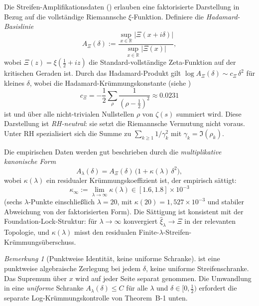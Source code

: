 \documentclass[12pt,a4paper]{article}
\theoremstyle{definition}
\theoremstyle{remark}
\newtheorem{remark}[theorem]{Bemerkung}
\begin{document}
Die Streifen-Amplifikationsdaten ()
erlauben eine faktorisierte Darstellung in Bezug auf die vollständige
Riemannsche $\xi$-Funktion. Definiere die \emph{Hadamard-Basislinie}
\begin{equation}\label{eq:A-Xi}
  A_\Xi(\delta) := \frac{\sup_{x\in\mathbb R}|\Xi(x+i\delta)|}
                        {\sup_{x\in\mathbb R}|\Xi(x)|},
\end{equation}
wobei $\Xi(z) = \xi(\tfrac{1}{2}+iz)$ die Standard-vollständige
Zeta-Funktion auf der kritischen Geraden ist. Durch das
Hadamard-Produkt gilt
$\log A_\Xi(\delta) \sim c_\Xi\,\delta^2$ für kleines $\delta$, wobei
die Hadamard-Krümmungskonstante (siehe )
\begin{equation}\label{eq:c-Xi}
  c_\Xi = -\frac{1}{2}\sum_\rho \frac{1}{(\rho-\tfrac{1}{2})^2}
        \approx 0.0231
\end{equation}
ist und über alle nicht-trivialen Nullstellen $\rho$ von $\zeta(s)$
summiert wird. Diese Darstellung ist \emph{RH-neutral}: sie setzt die
Riemannsche Vermutung nicht voraus. Unter RH spezialisiert sich die
Summe zu $\sum_{k\geq 1} 1/\gamma_k^2$ mit
$\gamma_k = \Im(\rho_k)$.

Die empirischen Daten werden gut beschrieben durch die
\emph{multiplikative kanonische Form}
\begin{equation}\label{eq:canonical-form}
  A_\lambda(\delta)
  = A_\Xi(\delta)\,\bigl(1 + \kappa(\lambda)\,\delta^2\bigr),
\end{equation}
wobei $\kappa(\lambda)$ ein residualer Krümmungskoeffizient ist, der
empirisch sättigt:
\begin{equation}\label{eq:kappa-inf}
  \kappa_\infty := \lim_{\lambda\to\infty}\kappa(\lambda)
  \in [1.6, 1.8]\times 10^{-3}
\end{equation}
(sechs $\lambda$-Punkte einschließlich $\lambda=20$, mit
$\kappa(20)=1{,}527\times 10^{-3}$ und stabiler Abweichung von der
faktorisierten Form). Die Sättigung ist konsistent mit der
Foundation-Lock-Struktur: für $\lambda\to\infty$ konvergiert
$\hat\xi_\lambda \to \Xi$ in der relevanten Topologie, und
$\kappa(\lambda)$ misst den residualen Finite-$\lambda$-Streifen-Krümmungsüberschuss.

\begin{remark}[Punktweise Identität, keine uniforme Schranke]
 ist eine punktweise algebraische Zerlegung bei
jedem $\delta$, keine uniforme Streifenschranke. Das Supremum über $x$
wird auf jeder Seite separat genommen. Die Umwandlung in eine
\emph{uniforme} Schranke $A_\lambda(\delta) \leq C$ für alle $\lambda$
und $\delta \in [0,\tfrac{1}{2})$ erfordert die separate
Log-Krümmungskontrolle von Theorem~B-1 unten.
\end{remark}
\end{document}
